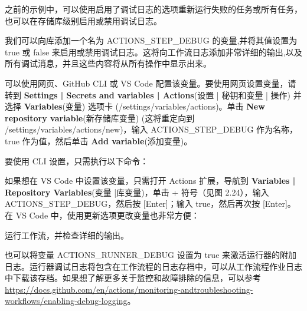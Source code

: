 
之前的示例中，可以使用启用了调试日志的选项重新运行失败的任务或所有任务，也可以在存储库级别启用或禁用调试日志。


我们可以向库添加一个名为 ACTIONS\_STEP\_DEBUG 的变量,并将其值设置为 true 或 false 来启用或禁用调试日志。这将向工作流日志添加非常详细的输出,以及所有调试消息，并且这些内容将从所有操作中显示出来。

可以使用网页、GitHub CLI 或 VS Code 配置该变量。要使用网页设置变量，请转到 \textbf{Settings | Secrets and variables | Actions}(设置 | 秘钥和变量 | 操作) 并选择 \textbf{Variables}(变量) 选项卡 (/settings/variables/actions)。单击 \textbf{New repository variable}(新存储库变量) (这将重定向到 /settings/variables/actions/new)，输入 ACTIONS\_STEP\_DEBUG 作为名称，true 作为值，然后单击 \textbf{Add variable}(添加变量)。

要使用 CLI 设置，只需执行以下命令：


如果想在 VS Code 中设置该变量，只需打开 Actions 扩展，导航到 \textbf{Variables | Repository Variables}(变量 |库变量)，单击 + 符号（见图 2.24），输入 ACTIONS\_STEP\_DEBUG，然后按 [Enter]；输入 true，然后再次按 [Enter]。在 VS Code 中，使用更新选项更改变量也非常方便：


运行工作流，并检查详细的输出。


也可以将变量 ACTIONS\_RUNNER\_DEBUG 设置为 true 来激活运行器的附加日志。运行器调试日志将包含在工作流程的日志存档中，可以从工作流程作业日志中下载该存档。如果想了解更多关于监控和故障排除的信息，可以参考\url{https://docs.github.com/en/actions/monitoring-andtroubleshooting-workflows/enabling-debug-logging}。